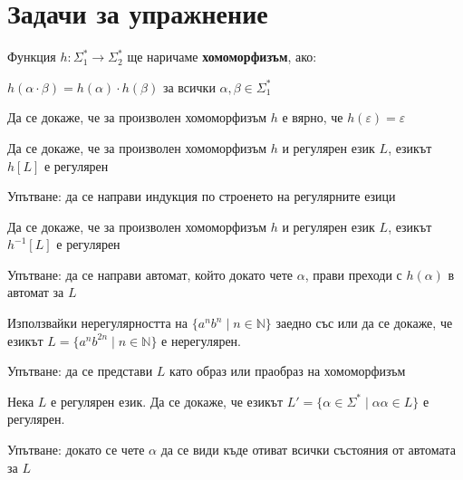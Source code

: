\section{Задачи за упражнение}

\begin{definition}
    Функция $h : \Sigma_1^* \rightarrow \Sigma_2^*$ ще наричаме \textbf{хомоморфизъм}, ако:
    \begin{center}
        $h(\alpha \cdot \beta) = h(\alpha) \cdot h(\beta)$ за всички $\alpha, \beta \in \Sigma_1^*$
    \end{center}
\end{definition}

\begin{problem}
Да се докаже, че за произволен хомоморфизъм $h$ е вярно, че $h(\varepsilon) = \varepsilon$
\end{problem}

\begin{problem}
Да се докаже, че за произволен хомоморфизъм $h$ и регулярен език $L$, езикът $h[L]$ е регулярен

Упътване: да се направи индукция по строенето на регулярните езици
\end{problem}

\begin{problem}
Да се докаже, че за произволен хомоморфизъм $h$ и регулярен език $L$, езикът $h^{-1}[L]$ е регулярен

Упътване: да се направи автомат, който докато чете $\alpha$, прави преходи с $h(\alpha)$ в автомат за $L$
\end{problem}

\begin{problem}
Използвайки нерегулярността на $\{ a^nb^n \mid n \in \mathbb{N} \}$ заедно със  или  да се докаже, че езикът $L = \{ a^nb^{2n} \mid n \in \mathbb{N} \}$ е нерегулярен.

Упътване: да се представи $L$ като образ или праобраз на хомоморфизъм
\end{problem}

\begin{problem}
Нека $L$ е регулярен език. Да се докаже, че езикът $L' = \{ \alpha \in \Sigma^* \mid \alpha \alpha \in L \}$ е регулярен.

Упътване: докато се чете $\alpha$ да се види къде отиват всички състояния от автомата за $L$
\end{problem}


